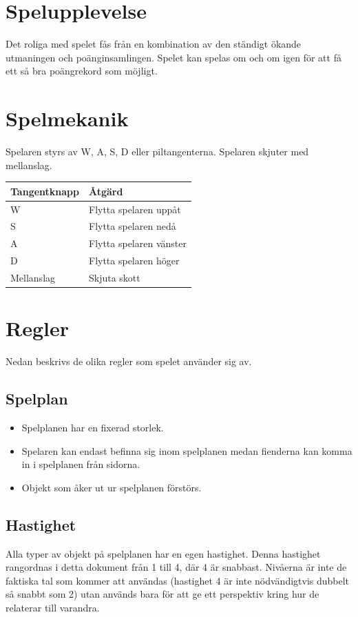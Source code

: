 \documentclass{TDP005mall}
\begin{document}
\section{Spelupplevelse}
Det roliga med spelet fås från en kombination av den ständigt ökande utmaningen och poänginsamlingen. Spelet kan spelas om och om igen för att få ett så bra poängrekord som möjligt.

\section{Spelmekanik}
Spelaren styrs av W, A, S, D eller piltangenterna. Spelaren skjuter med mellanslag.
\begin{table}[!h]
\begin{tabularx}{\linewidth}{|X|X|}
\hline
Tangentknapp & Åtgärd\\\hline
W & Flytta spelaren uppåt\\\hline
S & Flytta spelaren nedå\\\hline
A & Flytta spelaren vänster\\\hline
D & Flytta spelaren höger\\\hline
Mellanslag & Skjuta skott\\\hline

\end{tabularx}
\end{table}

\section{Regler}
Nedan beskrivs de olika regler som spelet använder sig av.
\subsection{Spelplan}
\begin{itemize}
\item Spelplanen har en fixerad storlek.
\item Spelaren kan endast befinna sig inom spelplanen medan fienderna kan komma in i spelplanen från sidorna. 
\item Objekt som åker ut ur spelplanen förstörs.
\end{itemize}

\subsection{Hastighet}
Alla typer av objekt på spelplanen har en egen hastighet. Denna hastighet rangordnas i detta dokument från 1 till 4, där 4 är snabbast.
Nivåerna är inte de faktiska tal som kommer att användas (hastighet 4 är inte nödvändigtvis dubbelt så snabbt som 2) 
utan används bara för att ge ett perspektiv kring hur de relaterar till varandra.
\end{document}
